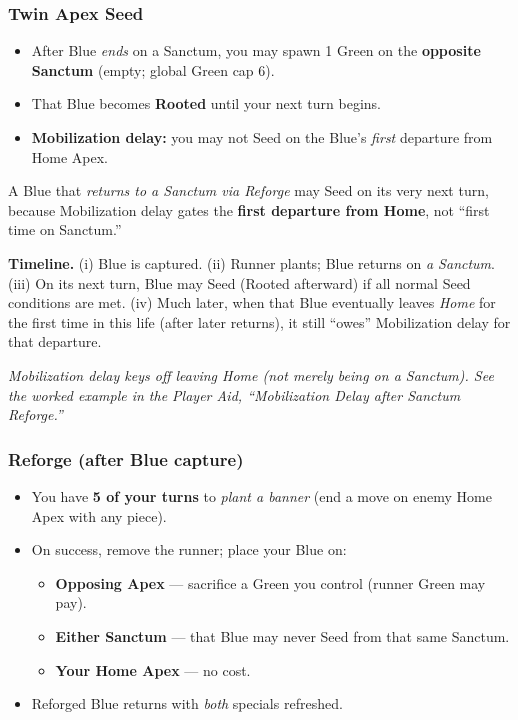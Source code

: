 \documentclass[11pt]{article}
\begin{document}
\begin{multicols}{2}
\columnbreak

\subsubsection*{Twin Apex Seed}
\begin{itemize}[leftmargin=1.1em,itemsep=0.2em]
  \item After Blue \emph{ends} on a Sanctum, you may spawn 1 Green on the \textbf{opposite Sanctum} (empty; global Green cap 6).
  \item That Blue becomes \textbf{Rooted} until your next turn begins.
  \item \textbf{Mobilization delay:} you may not Seed on the Blue’s \emph{first} departure from Home Apex.
\end{itemize}

\begin{tcolorbox}[enhanced,breakable,title={Worked Example — Mobilization Delay after Sanctum Reforge},
  colback=white,colframe=royal,boxrule=0.8pt]
\small
A Blue that \emph{returns to a Sanctum via Reforge} may Seed on its very next turn, because Mobilization delay gates the \textbf{first departure from Home}, not “first time on Sanctum.”

\textbf{Timeline.} (i) Blue is captured. (ii) Runner plants; Blue returns on \emph{a Sanctum}. (iii) On its next turn, Blue may Seed (Rooted afterward) if all normal Seed conditions are met. (iv) Much later, when that Blue eventually leaves \emph{Home} for the first time in this life (after later returns), it still “owes” Mobilization delay for that departure.
\end{tcolorbox}

\noindent\textit{Mobilization delay keys off leaving Home (not merely being on a Sanctum). See the worked example in the Player Aid, “Mobilization Delay after Sanctum Reforge.”}

\subsubsection*{Reforge (after Blue capture)}
\begin{itemize}[leftmargin=1.1em,itemsep=0.2em]
  \item You have \textbf{5 of your turns} to \emph{plant a banner} (end a move on enemy Home Apex with any piece).
  \item On success, remove the runner; place your Blue on:
  \begin{itemize}[leftmargin=1.1em,itemsep=0.15em]
    \item \textbf{Opposing Apex} — sacrifice a Green you control (runner Green may pay).
    \item \textbf{Either Sanctum} — that Blue may never Seed from that same Sanctum.
    \item \textbf{Your Home Apex} — no cost.
  \end{itemize}
  \item Reforged Blue returns with \emph{both} specials refreshed.
\end{itemize}


\end{multicols}
\end{document}
